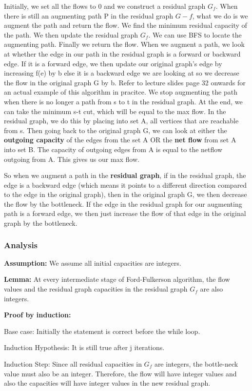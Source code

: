\documentclass[11pt, oneside]{article}
\theoremstyle{definition}
\begin{document}
Initially, we set all the flows to 0 and we construct a residual graph $G_f$. When there is still an augmenting path P in the residual graph $G-f$, what we do is we augment the path and return the flow. We find the minimum residual capacity of the path. We then update the residual graph $G_f$. We can use BFS to locate the augmenting path. Finally we return the flow. When we augment a path, we look at whether the edge in our path in the residual graph is a forward or backward edge. If it is a forward edge, we then update our original graph's edge by increasing f(e) by b else it is a backward edge we are looking at so we decrease the flow in the original graph G by b. Refer to lecture slides page 32 onwards for an actual example of this algorithm in pracitce. We stop augmenting the path when there is no longer a path from s to t in the residual graph. At the end, we can take the minimum s-t cut, which will be equal to the max flow. In the residual graph, we do this by placing into set A, all vertices that are reachable from s. Then going back to the original graph G, we can look at either the \textbf{outgoing capacity} of the edges from the set A OR the \textbf{net flow} from set A into set B. The capacity of outgoing edges from A is equal to the netflow outgoing from A. This gives us our max flow.

So when we augment a path in the \textbf{residual graph}, if in the residual graph, the edge is a backward edge (which means it points to a different direction compared to the edge in the original graph), then in the original graph G, we then decrease the flow by the bottleneck. If the edge in the residual graph for our augmenting path is a forward edge, we then just increase the flow of that edge in the original graph by the bottleneck.

\subsubsection{Analysis}
\textbf{Assumption:} We assume all initial capacities are integers.

\textbf{Lemma:} At every intermediate stage of Ford-Fulkerson algorithm, the flow values and the residual graph capacities in the residual graph $G_f$ are also integers.

\textbf{Proof by induction:}
\begin{addmargin}[1em]{2em}%
Base case: Initially the statement is correct before the while loop.

Induction Hypothesis: It is still true after j iterations.

Induction Step: Since all residual capacities in $G_f$ are integers, the bottle-neck value must also be an integer. Therefore, the flow will have integer values and also the capacities will have integer values in the new residual graph.
\end{addmargin}
\end{document}

